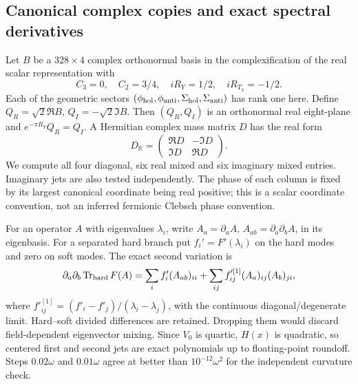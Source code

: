 \documentclass[11pt]{article}
\newcommand{\tr}{\operatorname{Tr}}
\begin{document}
\subsection{Canonical complex copies and exact spectral derivatives}
Let $B$ be a $328\times4$ complex orthonormal basis in the complexification
of the real scalar representation with
\begin{equation}
 C_3=0,\quad C_2=3/4,\quad iR_Y=1/2,\quad iR_{T_3}=-1/2.
\end{equation}
Each of the geometric sectors
$(\phi_{\rm hol},\phi_{\rm anti},\Sigma_{\rm hol},\Sigma_{\rm anti})$
has rank one here. Define $Q_R=\sqrt2\Re B$, $Q_I=-\sqrt2\Im B$.
Then $(Q_R,Q_I)$ is an orthonormal real eight-plane and
$e^{-\pi R_Y}Q_R=Q_I$. A Hermitian complex mass matrix $D$ has the real
form
\begin{equation}
 D_{\mathbb R}=\begin{pmatrix}\Re D&-\Im D\\ \Im D&\Re D\end{pmatrix}.
\label{eq:realification}
\end{equation}
We compute all four diagonal, six real mixed and six imaginary mixed
entries. Imaginary jets are also tested independently. The phase of each
column is fixed by its largest canonical coordinate being real positive;
this is a scalar coordinate convention, not an inferred fermionic Clebsch
phase convention.

For an operator $A$ with eigenvalues $\lambda_i$, write
$A_a=\partial_a A$, $A_{ab}=\partial_a\partial_bA$, in its eigenbasis.
For a separated hard branch put $f_i'=F'(\lambda_i)$ on the hard modes
and zero on soft modes. The exact second variation is
\begin{equation}
 \partial_a\partial_b\tr_{\rm hard}F(A)
 =\sum_i f_i'(A_{ab})_{ii}
 +\sum_{ij}f'^{[1]}_{ij}(A_a)_{ij}(A_b)_{ji},
\end{equation}
where $f'^{[1]}_{ij}=(f'_i-f'_j)/(\lambda_i-\lambda_j)$, with the
continuous diagonal/degenerate limit. Hard--soft divided differences
are retained. Dropping them would discard field-dependent eigenvector
mixing. Since $V_0$ is quartic, $H(x)$ is quadratic, so centered first and
second jets are exact polynomials up to floating-point roundoff. Steps
$0.02\omega$ and $0.01\omega$ agree at better than
$10^{-12}\omega^2$ for the independent curvature check.
\end{document}
